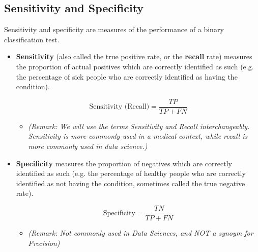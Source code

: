 \documentclass[]{report}
\begin{document}
\subsection*{Sensitivity and Specificity}
Sensitivity and specificity are measures of the performance of a binary classification
test.
\begin{itemize}
	\item \textbf{Sensitivity} (also called the true positive rate, or the \textbf{recall} rate) measures
	the proportion of actual positives which are correctly identified
	as such (e.g. the percentage of sick people who are correctly identified
	as having the condition).
	
	\[ \mbox{Sensitivity (Recall)} = \frac{TP}{TP +FN}\]
	
	\begin{itemize}
		\item \textit{(Remark: We will use the terms Sensitivity and Recall interchangeably.
			Sensitivity is more commonly used in a medical context, while recall is more
			commonly used in data science.)}
	\end{itemize}
	\item \textbf{Specificity} measures the proportion of negatives which are correctly
	identified as such (e.g. the percentage of healthy people who are correctly
	identified as not having the condition, sometimes called the true
	negative rate).
	
	\[ \mbox{Specificity} = \frac{TN}{TP +FN}\]
	
	\begin{itemize}
		\item \textit{(Remark: Not commonly used in Data Sciences, and NOT a synoym for Precision)}
	\end{itemize}
\end{itemize}
\end{document}
